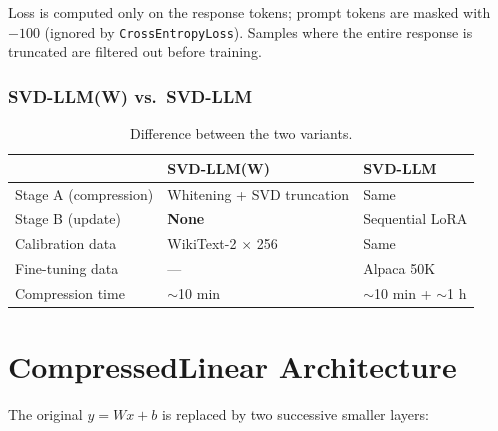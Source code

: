 \documentclass[11pt,a4paper]{article}
\newcommand{\Rbb}{\mathbb{R}}
\theoremstyle{remark}
\begin{document}
Loss is computed only on the response tokens; prompt tokens are masked with
$-100$ (ignored by \texttt{CrossEntropyLoss}).
Samples where the entire response is truncated are filtered out before training.

\subsubsection*{SVD-LLM(W) vs.\ SVD-LLM}

\begin{table}[H]
\centering
\caption{Difference between the two variants.}
\begin{tabular}{@{}lll@{}}
\toprule
& \textbf{SVD-LLM(W)} & \textbf{SVD-LLM} \\
\midrule
Stage A (compression) & Whitening + SVD truncation & Same \\
Stage B (update)      & \textbf{None}              & Sequential LoRA \\
Calibration data      & WikiText-2 $\times$ 256    & Same \\
Fine-tuning data      & ---                        & Alpaca 50K \\
Compression time      & $\sim$10 min               & $\sim$10 min + $\sim$1 h \\
\bottomrule
\end{tabular}
\end{table}

\section{CompressedLinear Architecture}
\label{sec:arch}

The original $y = Wx + b$ is replaced by two successive smaller layers:

\begin{center}
\end{center}
\end{document}
